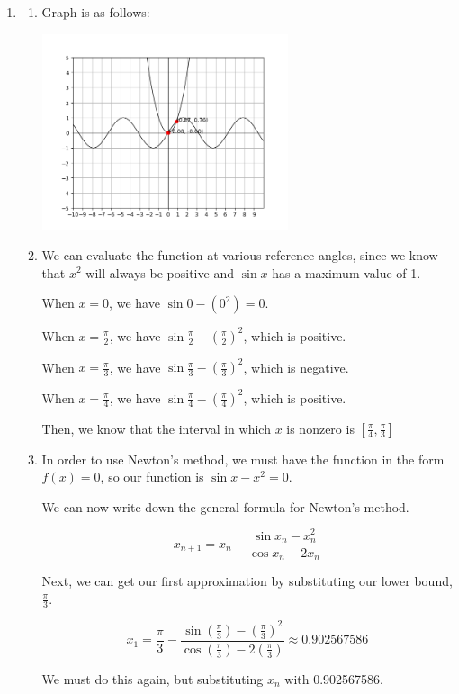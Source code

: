 \documentclass[11pt, letterpaper, twoside]{article}
\begin{document}
\begin{enumerate}
\item %
\begin{enumerate}[label=\alph*)]
\item Graph is as follows:

\includegraphics[width=0.6\textwidth]{q5}\par\vspace{1cm}
\item We can evaluate the function at various reference angles, since we know that \(x^2\) will always be positive and \(\sin x\) has a maximum value of 1.

When \(x=0\), we have \(\sin0-(0^2)=0\).

When \(x=\frac{\pi}{2}\), we have \(\sin\frac{\pi}{2}-(\frac{\pi}{2})^2\), which is positive.

When \(x=\frac{\pi}{3}\), we have \(\sin\frac{\pi}{3}-(\frac{\pi}{3})^2\), which is negative.

When \(x=\frac{\pi}{4}\), we have \(\sin\frac{\pi}{4}-(\frac{\pi}{4})^2\), which is positive.

Then, we know that the interval in which \(x\) is nonzero is \([\frac{\pi}{4}, \frac{\pi}{3}]\)

\item 
In order to use Newton's method, we must have the function in the form \(f(x)=0\), so our function is \(\sin x - x^2=0\).

We can now write down the general formula for Newton's method.

\[x_{n+1}=x_n-\frac{\sin x_n-x_n^2}{\cos x_n -2x_n}\]

Next, we can get our first approximation by substituting our lower bound, \(\frac{\pi}{3}\).

\[x_1=\frac{\pi}{3}-\frac{\sin(\frac{\pi}{3})-\left(\frac{\pi}{3}\right)^2}{\cos(\frac{\pi}{3})-2\left(\frac{\pi}{3}\right)}\approx0.902567586\]

We must do this again, but substituting \(x_n\) with 0.902567586.


\end{enumerate}
\end{enumerate}
\end{document}

